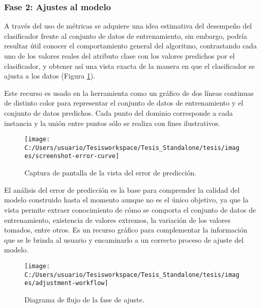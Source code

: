\subsubsection*{Fase 2: Ajustes al modelo}

A través del uso de métricas se adquiere una idea estimativa del desempeño
del clasificador frente al conjunto de datos de entrenamiento, sin
embargo, podría resultar útil conocer el comportamiento general del
algoritmo, contrastando cada uno de los valores reales del atributo
clase con los valores predichos por el clasificador, y obtener así
una vista exacta de la manera en que el clasificador se ajusta a los
datos (Figura \ref{fig:screenshot-error-curve}). 

Este recurso es usado en la herramienta como un gráfico de dos líneas
continuas de distinto color para representar el conjunto de datos
de entrenamiento y el conjunto de datos predichos. Cada punto del
dominio corresponde a cada instancia y la unión entre puntos sólo
se realiza con fines ilustrativos. 

\begin{figure}
\begin{centering}
\texttt{[image: C:/Users/usuario/Tesisworkspace/Tesis\_Standalone/tesis/images/screenshot-error-curve]}
\par\end{centering}

\caption{Captura de pantalla de la vista del error de predicción. \label{fig:screenshot-error-curve}}
\end{figure}


El análisis del error de predicción es la base para comprender la
calidad del modelo construido hasta el momento aunque no es el único
objetivo, ya que la vista permite extraer conocimiento de cómo se
comporta el conjunto de datos de entrenamiento, existencia de valores
extremos, la variación de los valores tomados, entre otros. Es un
recurso gráfico para complementar la información que se le brinda
al usuario y encaminarlo a un correcto proceso de ajuste del modelo. 

\begin{figure}
\begin{centering}
\texttt{[image: C:/Users/usuario/Tesisworkspace/Tesis\_Standalone/tesis/images/adjustment-workflow]}
\par\end{centering}

\caption{Diagrama de flujo de la fase de ajuste.\label{fig:adjustment-workflow}}
\end{figure}


